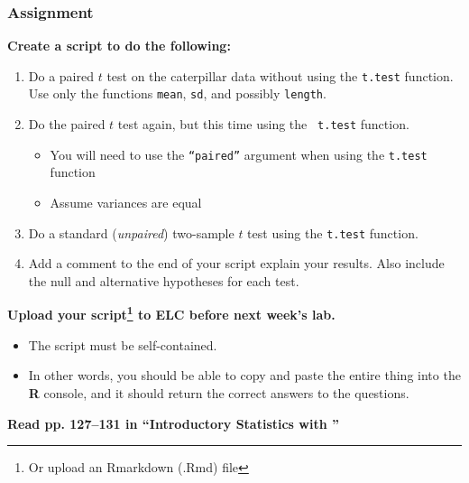 \documentclass[color=usenames,dvipsnames]{beamer}\usepackage[]{graphicx}\usepackage[]{color}
\newcommand{\inr}[1]{\colorbox{inlinecolor}{\texttt{#1}}}
\begin{document}







\begin{frame}
  \frametitle{Assignment}
  \footnotesize
  {\bf Create a script to do the following:}
  \begin{enumerate}[\bf (1)]
    \item Do a paired $t$ test on the caterpillar data without using the \inr{t.test}
      function. Use only the functions \inr{mean}, \inr{sd}, and
      possibly \inr{length}.
    \item Do the paired $t$ test again, but this time using the \inr{
        t.test} function.
      \begin{itemize}
        \scriptsize
        \item You will need to use the \texttt{``paired''} argument when using the \inr{t.test} function
        \item Assume variances are equal
      \end{itemize}
    \item Do a standard ({\it unpaired}) two-sample $t$ test using
      the \inr{t.test} function.
    \item Add a comment to the end of your script explain your
      results. Also include the null and alternative hypotheses for
      each test. %
  \end{enumerate}
  \vfill
  {\bf Upload your script\footnote{\scriptsize Or upload an Rmarkdown
      (.Rmd) file} to ELC before next week's lab.}
  \begin{itemize}
    \item The script must be self-contained.
    \item In other words, you should be able to copy and paste the
      entire thing into the {\bf R} console, and it should return the
      correct answers to the questions.
  \end{itemize}
  \vfill
   {\bf Read pp. 127--131 in ``Introductory Statistics with \R''}
\end{frame}
\end{document}
